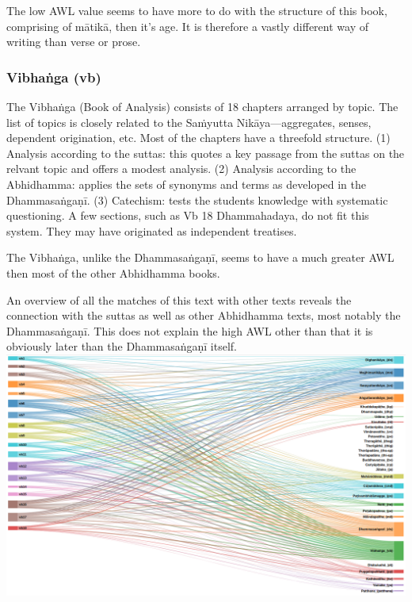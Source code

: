 The low AWL value seems to have more to do with the structure of this book, comprising of mātikā, then it's age. It is therefore a vastly different way of writing than verse or prose.

\subsubsection{Vibhaṅga (vb)}
The Vibhaṅga (Book of Analysis) consists of 18 chapters arranged by topic. The list of topics is closely related to the Saṁyutta Nikāya—aggregates, senses, dependent origination, etc. Most of the chapters have a threefold structure. (1) Analysis according to the suttas: this quotes a key passage from the suttas on the relvant topic and offers a modest analysis. (2) Analysis according to the Abhidhamma: applies the sets of synonyms and terms as developed in the Dhammasaṅgaṇī. (3) Catechism: tests the students knowledge with systematic questioning. A few sections, such as Vb 18 Dhammahadaya, do not fit this system. They may have originated as independent treatises.

The Vibhaṅga, unlike the Dhammasaṅgaṇī, seems to have a much greater AWL then most of the other Abhidhamma books. 

An overview of all the matches of this text with other texts reveals the connection with the suttas as well as other Abhidhamma texts, most notably the Dhammasaṅgaṇī. This does not explain the high AWL other than that it is obviously later than the Dhammasaṅgaṇī itself.\\

\includegraphics[width=\linewidth]{vbmatches.png}
\label{vbmatches}

